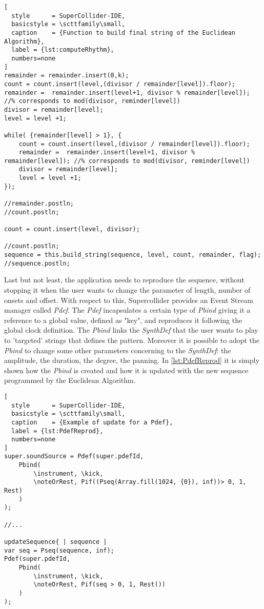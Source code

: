 \documentclass[main.tex]{subfiles}
\begin{document}
\begin{lstlisting}[
  style      = SuperCollider-IDE,
  basicstyle = \scttfamily\small,
  caption    = {Function to build final string of the Euclidean Algorithm},
  label = {lst:computeRhythm},
  numbers=none
]
remainder = remainder.insert(0,k);
count = count.insert(level,(divisor / remainder[level]).floor);
remainder =  remainder.insert(level+1, divisor % remainder[level]); //% corresponds to mod(divisor, reminder[level])
divisor = remainder[level];
level = level +1;

while( {remainder[level] > 1}, {
	count = count.insert(level,(divisor / remainder[level]).floor);
	remainder =  remainder.insert(level+1, divisor % remainder[level]); //% corresponds to mod(divisor, reminder[level])
	divisor = remainder[level];
	level = level +1;
});

//remainder.postln;
//count.postln;

count = count.insert(level, divisor);

//count.postln;
sequence = this.build_string(sequence, level, count, remainder, flag);
//sequence.postln;

\end{lstlisting}

Last but not least, the application needs to reproduce the sequence, without stopping it when the user wants to change the parameter of length, number of onsets and offset. With respect to this, Supercollider provides an Event Stream manager called \textit{Pdef}. The \textit{Pdef} incapsulates a certain type of \textit{Pbind} giving it a reference to a global value, defined as "key", and reproduces it following the global clock definition. The \textit{Pbind} links the \textit{SynthDef} that the user wants to play to 'targeted' strings that defines the pattern. Moreover it is possible to adopt the \textit{Pbind} to change some other parameters concerning to the \textit{SynthDef}: the amplitude, the duration, the degree, the panning. In \autoref{lst:PdefReprod} it is simply shown how the \textit{Pbind} is created and how it is updated with the new sequence programmed by the Euclidean Algorithm.\\
\begin{lstlisting}[
  style      = SuperCollider-IDE,
  basicstyle = \scttfamily\small,
  caption    = {Example of update for a Pdef},
  label = {lst:PdefReprod},
  numbers=none
]
super.soundSource = Pdef(super.pdefId,
	Pbind(
		\instrument, \kick,
		\noteOrRest, Pif((Pseq(Array.fill(1024, {0}), inf))> 0, 1, Rest)
	)
);

//...

updateSequence{ | sequence |
var seq = Pseq(sequence, inf);
Pdef(super.pdefId,
	Pbind(
		\instrument, \kick,
		\noteOrRest, Pif(seq > 0, 1, Rest())
	)
);

\end{lstlisting}
\end{document}
